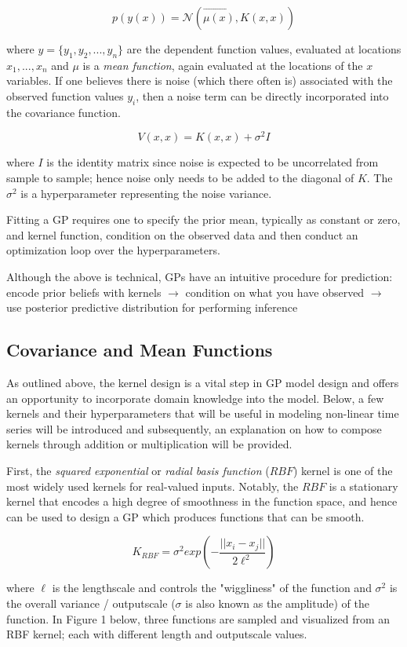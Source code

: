 $$p(y(x)) = \mathcal{N}(\vec{\mu(x)}, K(x, x))$$

where $y = \{y_1, y_2,. . .,y_n\}$ are the dependent function values, evaluated at locations $x_1,. . .,x_n$ and $\mu$ is a \textit{mean function}, again evaluated at the locations of the $x$ variables. If one believes there is noise (which there often is) associated with the observed function values $y_i$, then a noise term can be directly incorporated into the covariance function. 

$$V(x, x) = K(x, x) + \sigma^2I$$

where $I$ is the identity matrix since noise is expected to be uncorrelated from sample to sample; hence noise only needs to be added to the diagonal of $K$. The $\sigma^2$ is a hyperparameter representing the noise variance.

Fitting a GP requires one to specify the prior mean, typically as constant or zero, and kernel function, condition on the observed data and then conduct an optimization loop over the hyperparameters.


Although the above is technical, GPs have an intuitive procedure for prediction: encode prior beliefs with kernels $\rightarrow$ condition on what you have observed $\rightarrow$ use posterior predictive distribution for performing inference

\subsection{Covariance and Mean Functions}

As outlined above, the kernel design is a vital step in GP model design and offers an opportunity to incorporate domain knowledge into the model. Below, a few kernels and their hyperparameters that will be useful in modeling non-linear time series will be introduced and subsequently, an explanation on how to compose kernels through addition or multiplication will be provided.

First, the \textit{squared exponential} or \textit{radial basis function} ($RBF$) kernel is one of the most widely used kernels for real-valued inputs. Notably, the $RBF$ is a stationary kernel that encodes a high degree of smoothness in the function space, and hence can be used to design a GP which produces functions that can be smooth. 

$$K_{RBF} = \sigma^2 exp(-\frac{||x_i - x_j||}{2 \ell^2})$$

where $\ell$ is the lengthscale and controls the "wiggliness" of the function and $\sigma^2$ is the overall variance / outputscale  ($\sigma$ is also known as the amplitude) of the function. In Figure 1 below, three functions are sampled and visualized from an RBF kernel; each with different length and outputscale values.

